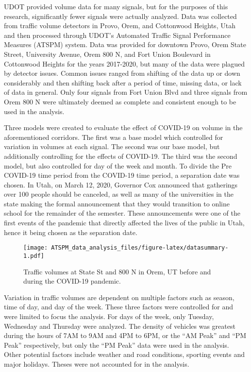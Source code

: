 \documentclass[3p, authoryear]{elsarticle} %
\begin{document}
UDOT provided volume data for many signals, but for the purposes of this research, significantly fewer signals were actually analyzed. Data was collected from traffic volume detectors in Provo, Orem, and Cottonwood Heights, Utah and then processed through UDOT's Automated Traffic Signal Performance Measures (ATSPM) system. Data was provided for downtown Provo, Orem State Street, University Avenue, Orem 800 N, and Fort Union Boulevard in Cottonwood Heights for the years 2017-2020, but many of the data were plagued by detector issues. Common issues ranged from shifting of the data up or down considerably and then shifting back after a period of time, missing data, or lack of data in general. Only four signals from Fort Union Blvd and three signals from Orem 800 N were ultimately deemed as complete and consistent enough to be used in the analysis.

Three models were created to evaluate the effect of COVID-19 on volume in the aforementioned corridors. The first was a base model which controlled for variation in volumes at each signal. The second was our base model, but additionally controlling for the effects of COVID-19. The third was the second model, but also controlled for day of the week and month. To divide the Pre COVID-19 time period from the COVID-19 time period, a separation date was chosen. In Utah, on March 12, 2020, Governor Cox announced that gatherings over 100 people should be canceled, as well as many of the universities in the state making the formal announcement that they would transition to online school for the remainder of the semester. These announcements were one of the first events of the pandemic that directly affected the lives of the public in Utah, hence it being chosen as the separation date.

\begin{figure}
\centering
\texttt{[image: ATSPM\_data\_analysis\_files/figure-latex/datasummary-1.pdf]}
\caption{\label{fig:datasummary}Traffic volumes at State St and 800 N in Orem, UT before and during the COVID-19 pandemic.}
\end{figure}

Variation in traffic volumes are dependent on multiple factors such as season, time of day, and day of the week. These three factors were controlled for and were limited to focus the analysis. For days of the week, only Tuesday, Wednesday and Thursday were analyzed. The density of vehicles was greatest during the hours of 7AM to 9AM and 4PM to 6PM, or the ``AM Peak'' and ``PM Peak'' respectively, but only the ``PM Peak'' data were used in the analysis. Other potential factors include weather and road conditions, sporting events and major holidays. Theses were not accounted for in the analysis.
\end{document}
